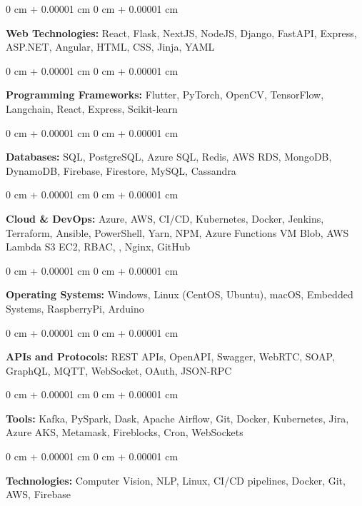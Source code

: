 \documentclass[10pt, letterpaper]{article}
\newenvironment{onecolentry}{
    \begin{adjustwidth}{
        0 cm + 0.00001 cm
    }{
        0 cm + 0.00001 cm
    }
}{
    \end{adjustwidth}
} %
\begin{document}
        \begin{onecolentry}
            \textbf{Web Technologies:} React, Flask, NextJS, NodeJS, Django, FastAPI, Express, ASP.NET, Angular, HTML, CSS, Jinja, YAML
        \end{onecolentry}
        
        \begin{onecolentry}
            \textbf{Programming Frameworks:} Flutter, PyTorch, OpenCV, TensorFlow, Langchain, React, Express, Scikit-learn
        \end{onecolentry}
        
        \begin{onecolentry}
            \textbf{Databases:} SQL, PostgreSQL, Azure SQL, Redis, AWS RDS, MongoDB, DynamoDB, Firebase, Firestore, MySQL, Cassandra
        \end{onecolentry}
        
        \begin{onecolentry}
            \textbf{Cloud \& DevOps:} Azure, AWS, CI/CD, Kubernetes, Docker, Jenkins, Terraform, Ansible, PowerShell, Yarn, NPM, Azure Functions VM Blob, AWS Lambda S3 EC2, RBAC, , Nginx, GitHub
        \end{onecolentry}
        
        \begin{onecolentry}
            \textbf{Operating Systems:} Windows, Linux (CentOS, Ubuntu), macOS, Embedded Systems, RaspberryPi, Arduino
        \end{onecolentry}
        
        \begin{onecolentry}
            \textbf{APIs and Protocols:} REST APIs, OpenAPI, Swagger, WebRTC, SOAP, GraphQL, MQTT, WebSocket, OAuth, JSON-RPC
        \end{onecolentry}
        
        \begin{onecolentry}
            \textbf{Tools:} Kafka, PySpark, Dask, Apache Airflow, Git, Docker, Kubernetes, Jira, Azure AKS, Metamask, Fireblocks, Cron, WebSockets
        \end{onecolentry}
        
        \begin{onecolentry}
            \textbf{Technologies:} Computer Vision, NLP, Linux, CI/CD pipelines, Docker, Git, AWS, Firebase
        \end{onecolentry}
        


    
\end{document}
